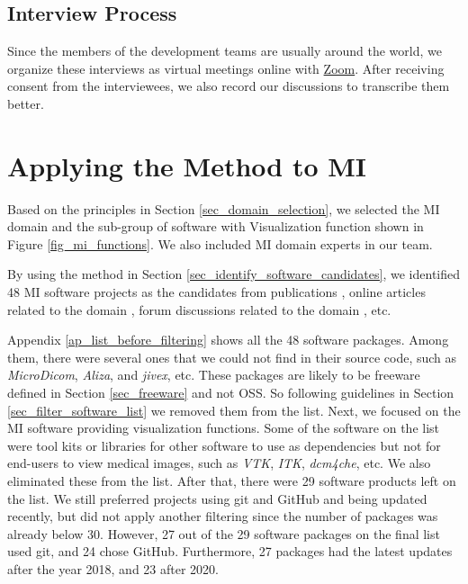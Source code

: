 \subsection{Interview Process}
Since the members of the development teams are usually around the world, we organize these interviews as virtual meetings online with \hyperlink{https://zoom.us/}{Zoom}. After receiving consent from the interviewees, we also record our discussions to transcribe them better.

\section{Applying the Method to MI}
\label{sec_applying_method}

Based on the principles in Section \ref{sec_domain_selection}, we selected the MI domain and the sub-group of software with Visualization function shown in Figure \ref{fig_mi_functions}. We also included MI domain experts in our team.

By using the method in Section \ref{sec_identify_software_candidates}, we identified 48 MI software projects as the candidates from publications \cite{Bjorn2017} \cite{Bruhschwein2019} \cite{Haak2015}, online articles related to the domain \cite{Emms2019} \cite{Hasan2020} \cite{Mu2019}, forum discussions related to the domain \cite{Samala2014}, etc.

Appendix \ref{ap_list_before_filtering} shows all the 48 software packages. Among them, there were several ones that we could not find in their source code, such as \textit{MicroDicom}, \textit{Aliza}, and \textit{jivex}, etc. These packages are likely to be freeware defined in Section \ref{sec_freeware} and not OSS. So following guidelines in Section \ref{sec_filter_software_list} we removed them from the list. Next, we focused on the MI software providing visualization functions. Some of the software on the list were tool kits or libraries for other software to use as dependencies but not for end-users to view medical images, such as \textit{VTK}, \textit{ITK}, \textit{dcm4che}, etc. We also eliminated these from the list. After that, there were 29 software products left on the list. We still preferred projects using git and GitHub and being updated recently, but did not apply another filtering since the number of packages was already below 30. However, 27 out of the 29 software packages on the final list used git, and 24 chose GitHub. Furthermore, 27 packages had the latest updates after the year 2018, and 23 after 2020.

